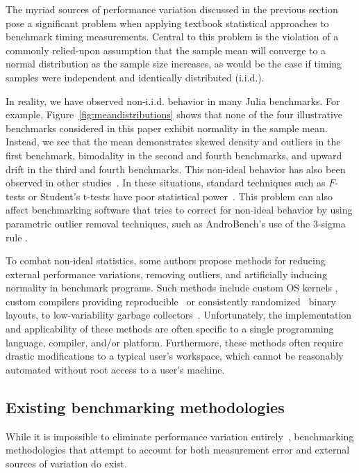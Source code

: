 \documentclass[conference]{IEEEtran}
\begin{document}
The myriad sources of performance variation discussed in the previous section pose a
significant problem when applying textbook statistical approaches to benchmark timing
measurements. Central to this problem is the violation of a commonly relied-upon assumption
that the sample mean will converge to a normal distribution as the sample size increases,
as would be the case if timing samples were independent and identically distributed (i.i.d.).

In reality, we have observed non-i.i.d. behavior in many Julia benchmarks. For example,
Figure~\ref{fig:meandistributions} shows that none of the four illustrative benchmarks
considered in this paper exhibit normality in the sample mean. Instead, we see that the mean
demonstrates skewed density and outliers in the first benchmark, bimodality in the second
and fourth benchmarks, and upward drift in the third and fourth benchmarks. This non-ideal
behavior has also been observed in other studies~\cite{Gil2011, Chen2015,
Rehn2015,Barrett2016}. In these situations, standard techniques such as $F$-tests or
Student's t-tests have poor statistical
power~\cite{Lilja2000,Mytkowicz2009,Kalibera2013,Chen2015, Barrett2016}. This problem can
also affect benchmarking software that tries to correct for non-ideal behavior by using
parametric outlier removal techniques, such as AndroBench's use of the 3-sigma rule
\cite{Kim2012}.

To combat non-ideal statistics, some authors propose methods for reducing external
performance variations, removing outliers, and artificially inducing normality in benchmark
programs. Such methods include custom OS kernels \cite{Tessellation,Akkan2012}, custom
compilers providing reproducible~\cite{Georges2008} or consistently
randomized~\cite{Curtsinger2013} binary layouts, to low-variability garbage
collectors~\cite{Huang2004}. Unfortunately, the implementation and applicability of these
methods are often specific to a single programming language, compiler, and/or platform.
Furthermore, these methods often require drastic modifications to a typical user's
workspace, which cannot be reasonably automated without root access to a user's machine.

\subsection{Existing benchmarking methodologies}
\label{sec:existingtools}

While it is impossible to eliminate performance variation
entirely~\cite{Alcocer2015,Barrett2016}, benchmarking methodologies that attempt to account
for both measurement error and external sources of variation do exist.
\end{document}
